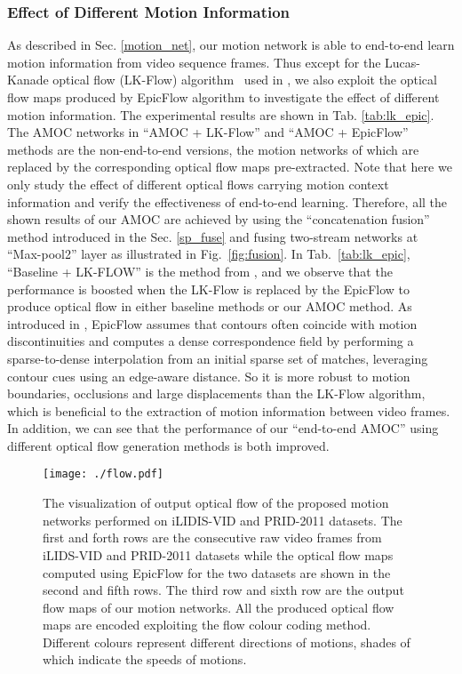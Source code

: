\documentclass[journal]{IEEEtran}
\begin{document}
 \subsubsection{Effect of Different Motion Information }
 As described in Sec. \ref{motion_net}, our motion network  is able to end-to-end learn motion information from video sequence frames. Thus except for the Lucas-Kanade optical flow (LK-Flow) algorithm~\cite{lucas1981iterative} used in \cite{mclaughlinrecurrent}, we  also exploit the optical flow maps produced by EpicFlow\cite{revaud2015epicflow} algorithm to investigate the effect of different motion information. The experimental results are shown in Tab. \ref{tab:lk_epic}. The AMOC networks in ``AMOC + LK-Flow'' and ``AMOC + EpicFlow'' methods are the non-end-to-end versions, the motion networks of which are replaced by the corresponding optical flow maps pre-extracted. Note that here we only study the effect of different optical flows carrying motion context information and verify the effectiveness of end-to-end learning. Therefore, all the shown results of our AMOC are achieved by using the ``concatenation fusion'' method introduced in the Sec. \ref{sp_fuse} and fusing two-stream networks at ``Max-pool2'' layer as illustrated in Fig.~\ref{fig:fusion}. In Tab.~\ref{tab:lk_epic}, ``Baseline + LK-FLOW'' is the method from \cite{mclaughlinrecurrent}, and we observe that the performance is boosted when the LK-Flow is replaced by the EpicFlow to produce optical flow in either baseline methods or our AMOC method. As introduced in \cite{revaud2015epicflow}, EpicFlow assumes that contours often coincide with motion discontinuities and computes a dense correspondence field by performing a sparse-to-dense interpolation from an initial sparse set of matches, leveraging contour cues using an edge-aware distance.  So it is more robust to motion boundaries, occlusions and large displacements than the LK-Flow algorithm\cite{lucas1981iterative}, which is beneficial to the extraction of motion information between video frames. In addition, we can see that the performance of our ``end-to-end AMOC'' using different optical flow generation methods is both improved. 
 
 \begin{figure*}[htb]
 	\centering
 	\texttt{[image: ./flow.pdf]}
 	\vspace{-3.5mm}	
 	\caption{The visualization of output optical flow of the proposed motion networks performed on iLIDIS-VID and PRID-2011 datasets. The first and forth rows are the consecutive raw video frames from iLIDS-VID and PRID-2011 datasets while the optical flow maps computed using EpicFlow\cite{revaud2015epicflow} for the two datasets are shown in the second and fifth rows. The third row and sixth row are the output flow maps of our motion networks. All the produced optical flow maps are encoded exploiting the flow colour coding\cite{baker2011database} method. Different colours represent different directions of motions, shades of which indicate the speeds of motions. }
 	
 	\label{fig:flow_demo}
 \end{figure*}
 
\end{document}
